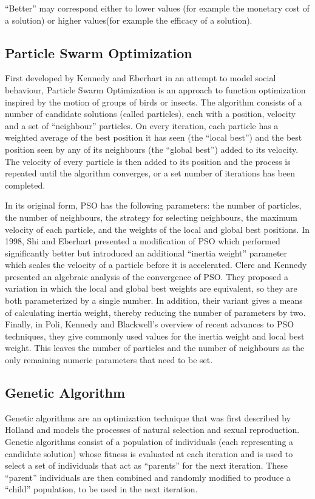 \documentclass{sig-alternate}
\begin{document}
``Better'' may correspond either to lower values (for example the monetary cost of a solution) or higher values(for example the efficacy of a solution).

\subsection{Particle Swarm Optimization}\label{sec:backgroud-PSO}
First developed by Kennedy and Eberhart in an attempt to model social behaviour, Particle Swarm Optimization is an approach to function optimization inspired by the motion of groups of birds or insects\cite{Kennedy1995}. The algorithm consists of a number of candidate solutions (called particles), each with a position, velocity and a set of ``neighbour'' particles. On every iteration, each particle has a weighted average of the best position it has seen (the ``local best'') and the best position seen by any of its neighbours (the ``global best'') added to its velocity. The velocity of every particle is then added to its position and the process is repeated until the algorithm converges, or a set number of iterations has been completed.

In its original form, PSO has the following parameters: the number of particles, the number of neighbours, the strategy for selecting neighbours, the maximum velocity of each particle, and the weights of the local and global best positions. In 1998, Shi and Eberhart presented a modification of PSO which performed significantly better but introduced an additional ``inertia weight'' parameter which scales the velocity of a particle before it is accelerated\cite{Shi1998}. Clerc and Kennedy presented an algebraic analysis of the convergence of PSO\cite{Clerc2002}. They proposed a variation in which the local and global best weights are equivalent, so they are both parameterized by a single number. In addition, their variant gives a means of calculating inertia weight, thereby reducing the number of parameters by two. Finally, in Poli, Kennedy and Blackwell's overview of recent advances to PSO techniques, they give commonly used values for the inertia weight and local best weight\cite{Poli2007}. This leaves the number of particles and the number of neighbours as the only remaining numeric parameters that need to be set.


\subsection{Genetic Algorithm}\label{sec:background-GA}
Genetic algorithms are an optimization technique that was first described by Holland and models the processes of natural selection and sexual reproduction\cite{Holland1975}. Genetic algorithms consist of a population of individuals (each representing a candidate solution) whose fitness is evaluated at each iteration and is used to select a set of individuals that act as ``parents'' for the next iteration. These ``parent'' individuals are then combined and randomly modified to produce a ``child'' population, to be used in the next iteration.
\end{document}

